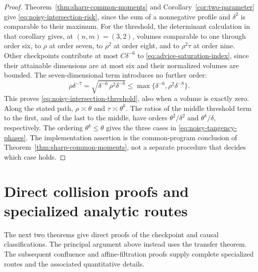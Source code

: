 \documentclass[11pt]{amsart}
\theoremstyle{definition}\newtheorem{definition}[theorem]{Definition}
\theoremstyle{remark}\newtheorem{remark}[theorem]{Remark}
\begin{document}
\begin{proof}
Theorem~\ref{thm:sharp-common-moments} and
Corollary~\ref{cor:two-parameter} give
\eqref{eq:noisy-intersection-risk}, since the sum of a nonnegative
profile and $\delta^2$ is comparable to their maximum.
For the threshold, the determinant calculation in that corollary gives,
at $(n,m)=(3,2)$, volumes comparable to one through order six, to
$\rho$ at order seven, to $\rho^2$ at order eight, and to
$\rho^2\tau$ at order nine. Other checkpoints contribute at most
$C\delta^{-6}$ to \eqref{eq:advice-saturation-index}, since their
attainable dimensions are at most six and their normalized volumes are
bounded. The seven-dimensional term introduces no further order:
\[
 \rho\delta^{-7}
   =\sqrt{\delta^{-6}\,\rho^2\delta^{-8}}
   \le\max\{\delta^{-6},\rho^2\delta^{-8}\}.
\]
This proves \eqref{eq:noisy-intersection-threshold}, also when a volume
is exactly zero. Along the stated path, $\rho\asymp\theta$ and
$\tau\asymp\theta^k$. The ratios of the middle threshold term to
the first, and of the last to the middle, have orders
$\theta^2/\delta^2$ and $\theta^k/\delta$, respectively.
The ordering $\theta^k\le\theta$ gives the three cases in
\eqref{eq:noisy-tangency-phases}. The implementation assertion is the
common-program conclusion of Theorem~\ref{thm:sharp-common-moments},
not a separate procedure that decides which case holds.
\end{proof}

\endgroup
\section{Direct collision proofs and specialized analytic routes}
\label{app:complete-routes}
The next two theorems give direct proofs of the checkpoint and causal
classifications. The principal argument above instead uses the transfer
theorem. The subsequent confluence and affine-filtration proofs supply
complete specialized routes and the associated quantitative details.
\end{document}
